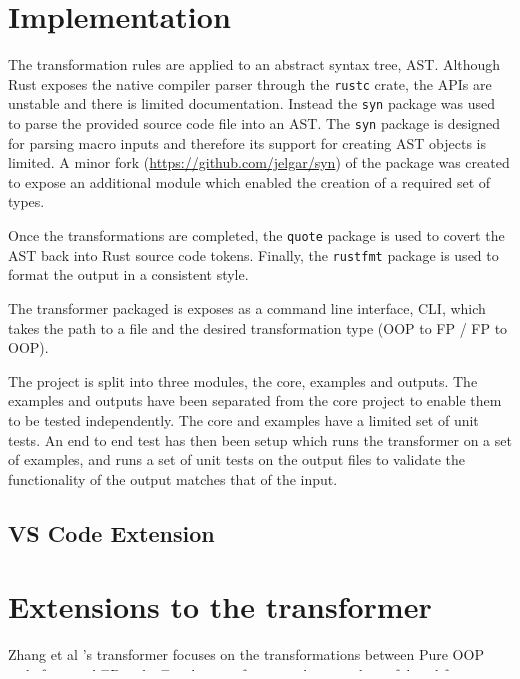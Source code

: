 \documentclass[ oneside,%
                    author={James Elgar},
                    degree={MEng},
                     title={Bidirectional transformer between functional and \\ object-oriented programming in Rust},
                  subtitle={}]{dissertation}
\newcommand{\weixin}{Zhang et al }
\begin{document}
\section{Implementation}

The transformation rules are applied to an abstract syntax tree, AST. 
Although Rust exposes the native compiler parser through the \verb|rustc| crate, the APIs are unstable and there is limited documentation. Instead the \verb|syn| package was used to parse the provided source code file into an AST. 
The \verb|syn| package is designed for parsing macro inputs and therefore its support for creating AST objects is limited. A minor fork (\url{https://github.com/jelgar/syn}) of the package was created to expose an additional module which enabled the creation of a required set of types.

Once the transformations are completed, the \verb|quote| package is used to covert the AST back into Rust source code tokens. Finally, the \verb|rustfmt| package is used to format the output in a consistent style.

The transformer packaged is exposes as a command line interface, CLI, which takes the path to a file and the desired transformation type (OOP to FP / FP to OOP). 

The project is split into three modules, the core, examples and outputs. The examples and outputs have been separated from the core project to enable them to be tested independently. The core and examples have a limited set of unit tests. An end to end test has then been setup which runs the transformer on a set of examples, and runs a set of unit tests on the output files to validate the functionality of the output matches that of the input.

\subsection{VS Code Extension}

\section{Extensions to the transformer}

\weixin's transformer focuses on the transformations between Pure OOP style from \cite{cook} and FP style. For the transformer to be a truely useful tool for developers, it must support the majority of styles of programming. 
The requirement to use pure OOP style is extremely restrictive, and often requires large refactoring of code before it can be transformed.
This means the types of OOP programs that can be transformed are limited.
\end{document}

